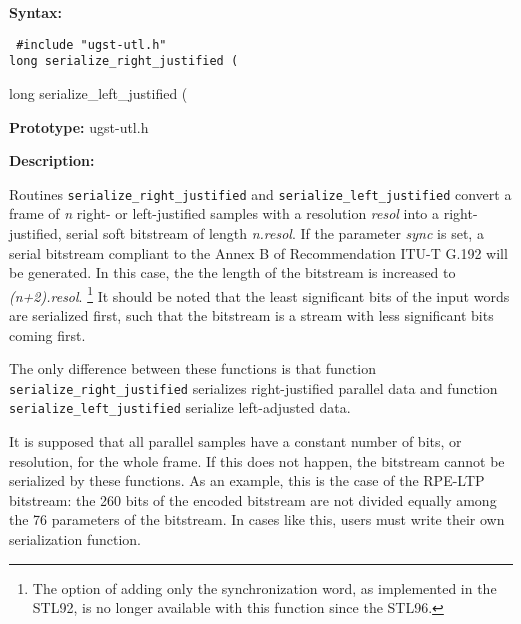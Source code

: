 {\bf Syntax: }

{\tt
\#include "ugst-utl.h"\\
long serialize\_right\_justified \hfill
         (

long serialize\_left\_justified \hfill
         (
}

{\bf Prototype: }    ugst-utl.h

{\bf Description: }

Routines {\tt serialize\_right\_justified} and {\tt serialize\_left\_justified} convert a frame of {\em n} right- or left-justified samples with a resolution {\em resol} into a right-justified, serial soft bitstream of length {\em n.resol}.
If the parameter {\em sync} is set, a serial bitstream compliant to the Annex B of Recommendation ITU-T G.192 will be generated.
In this case, the the length of the bitstream is increased to {\em (n+2).resol}.
\footnote{\SF The option of adding only the synchronization word, as implemented in the STL92, is no longer available with this function since the STL96.}
It should be noted that the least significant bits of the input words are serialized first, such that the bitstream is a stream with less significant bits coming first.

The only difference between these functions is that function {\tt serialize\_right\_justified} serializes right-justified parallel data and function {\tt serialize\_left\_justified} serialize left-adjusted data.

It is supposed that all parallel samples have a constant number of bits, or resolution, for the whole frame.
If this does not happen, the bitstream cannot be serialized by these functions.
As an example, this is the case of the RPE-LTP bitstream: the 260 bits of the encoded bitstream are not divided equally among the 76 parameters of the bitstream.
In cases like this, users must write their own serialization function.


